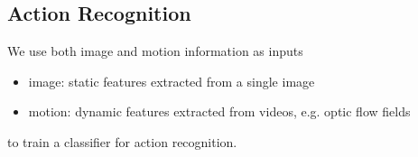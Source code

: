 \documentclass[twocolumn,landscape,10pt]{article}
\theoremstyle{definition}
\begin{document}
\subsection{Action Recognition}

We use both image and motion information as inputs
\begin{itemize}
    \item image: static features extracted from a single image
    \item motion: dynamic features extracted from videos, e.g. optic
        flow fields
\end{itemize} 
to train a classifier for action recognition.
\end{document}
